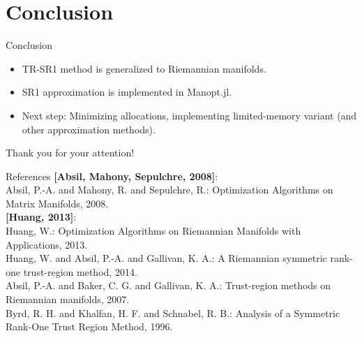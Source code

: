 \documentclass{beamer}
\begin{document}
\section{Conclusion}

\begin{frame}{Conclusion}
    \begin{itemize}
        \item TR-SR1 method is generalized to Riemannian manifolds.
        \item SR1 approximation is implemented in Manopt.jl.
        \item Next step: Minimizing allocations, implementing limited-memory variant (and other approximation methods).
    \end{itemize}
    \vspace{10mm}
    \begin{center}
        Thank you for your attention! 
    \end{center}
\end{frame}

\begin{frame}{References}
    \textbf{[Absil, Mahony, Sepulchre, 2008]}: \\
    Absil, P.-A. and Mahony, R. and Sepulchre, R.: Optimization Algorithms on Matrix Manifolds, 2008. \\[0.4\baselineskip]
    \textbf{[Huang, 2013]}: \\
    Huang, W.: Optimization Algorithms on Riemannian Manifolds with Applications, 2013. \\[0.4\baselineskip]
    Huang, W. and Absil, P.-A. and Gallivan, K. A.: A Riemannian symmetric rank-one trust-region method, 2014. \\[0.4\baselineskip]
    Absil, P.-A. and Baker, C. G. and Gallivan, K. A.: Trust-region methods on Riemannian manifolds, 2007. \\[0.4\baselineskip]
    Byrd, R. H. and Khalfan, H. F. and Schnabel, R. B.: Analysis of a Symmetric Rank-One Trust Region Method, 1996. 
\end{frame}

\end{document}

